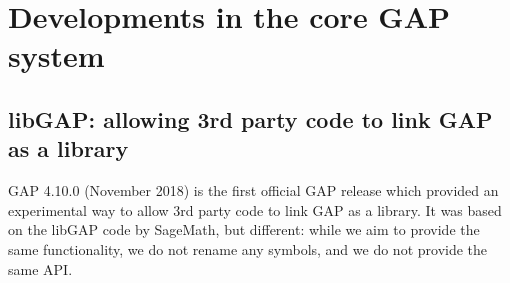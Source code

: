 \documentclass{deliverablereport}
\author{Author names}
\begin{document}
\maketitle
\githubissuedescription



\section{Developments in the core GAP system}

\subsection{libGAP: allowing 3rd party code to link GAP as a library}

GAP 4.10.0 (November 2018) is the first official GAP release
which provided an experimental way to allow 3rd party code to 
link GAP as a library. It was based on the libGAP code by SageMath, 
but different: while we aim to provide the same functionality, 
we do not rename any symbols, and we do not provide the same API. 
\end{document}
